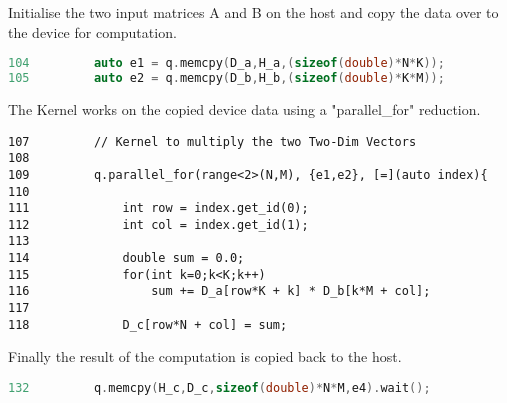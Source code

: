 \documentclass[14pt,fleqn]{article}
\begin{document}
Initialise the two input matrices A and B on the host and copy the data over to the device for computation. 
\begin{lstlisting}[language=C++]
104         auto e1 = q.memcpy(D_a,H_a,(sizeof(double)*N*K));
105         auto e2 = q.memcpy(D_b,H_b,(sizeof(double)*K*M));
\end{lstlisting}
The Kernel works on the copied device data using a "parallel\_for" reduction.
\begin{lstlisting}
107         // Kernel to multiply the two Two-Dim Vectors
108
109         q.parallel_for(range<2>(N,M), {e1,e2}, [=](auto index){
110
111             int row = index.get_id(0);
112             int col = index.get_id(1);
113
114             double sum = 0.0;
115             for(int k=0;k<K;k++)
116                 sum += D_a[row*K + k] * D_b[k*M + col];
117
118             D_c[row*N + col] = sum;
\end{lstlisting}
Finally the result of the computation is copied back to the host. 
\begin{lstlisting}[language=C++]
132         q.memcpy(H_c,D_c,sizeof(double)*N*M,e4).wait();
\end{lstlisting}
\\
\end{document}
